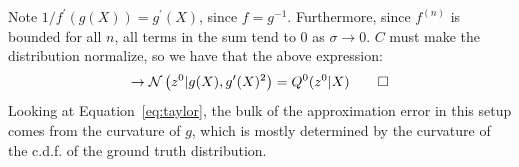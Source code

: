 \documentclass[a4paper, 11pt]{article} %
\newcommand{\todo}[1]{\textcolor{red}{TODO: #1}\PackageWarning{TODO:}{#1!}}
\begin{document}
Note $1/f^{\prime}(g(X))=g^\prime(X)$, since $f=g^{-1}$.  
Furthermore, since $f^{(n)}$ is bounded for all $n$, all terms in the sum tend to 0 as $\sigma\rightarrow 0$.  
$C$ must make the distribution normalize, so we have that the above expression:
\begin{equation}
  \rightarrow\mathcal{N}\left(z^0|g(X),g^\prime(X)^2\right)=Q^{0}(z^0|X) \qed
\end{equation}
Looking at Equation~\ref{eq:taylor}, the bulk of the approximation error in this setup comes from the curvature of $g$, which is mostly determined by the curvature of the c.d.f. of the ground truth distribution.
%








\end{document}
